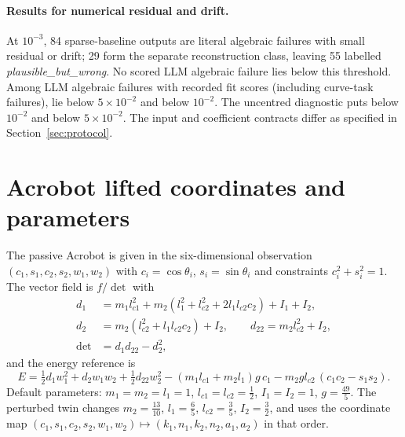 \documentclass[10pt]{article}
\begin{document}
\begin{table}[!htbp]
\centering\small
\tabSensitivity
\caption{Counts of literal algebraic failures below each numerical threshold. Reconstruction-dependent answers are included here, although they occupy a separate verdict class in Table~\ref{tab:results-sindy}. ``Uncentred'' evaluates the submitted expression; ``centred'' uses the quotient representative with its constant coefficient removed. Vanishing-task scores are unchanged. These counts describe diagnostics on the same returned expressions and are not capability comparisons.}
\label{tab:sensitivity}
\end{table}

\paragraph{Results for numerical residual and drift.} At $10^{-3}$, 84 sparse-baseline outputs are literal algebraic failures with small residual or drift; 29 form the separate reconstruction class, leaving 55 labelled \emph{plausible\_but\_wrong}. No scored LLM algebraic failure lies below this threshold. Among \nFit{} LLM algebraic failures with recorded fit scores (including curve-task failures), \nFitMid{} lie below $5\times10^{-2}$ and \nFitLow{} below $10^{-2}$. The uncentred diagnostic puts \nLegacyLow{} below $10^{-2}$ and \nLegacyMid{} below $5\times10^{-2}$. The input and coefficient contracts differ as specified in Section~\ref{sec:protocol}.

\section{Acrobot lifted coordinates and parameters}\label{app:acrobot}

The passive Acrobot is given in the six-dimensional observation $(c_1,s_1,c_2,s_2,w_1,w_2)$ with $c_i=\cos\theta_i$, $s_i=\sin\theta_i$ and constraints $c_i^2+s_i^2=1$. The vector field is $f/\det$ with
\begin{align*}
d_1 &= m_1 l_{c1}^2 + m_2(l_1^2 + l_{c2}^2 + 2 l_1 l_{c2} c_2) + I_1 + I_2,\\
d_2 &= m_2(l_{c2}^2 + l_1 l_{c2} c_2) + I_2,\qquad d_{22} = m_2 l_{c2}^2 + I_2,\\
\det &= d_1 d_{22} - d_2^2,
\end{align*}
and the energy reference is
\[
E = \tfrac12 d_1 w_1^2 + d_2 w_1 w_2 + \tfrac12 d_{22} w_2^2
    - (m_1 l_{c1} + m_2 l_1) g\, c_1
    - m_2 g l_{c2}\,(c_1 c_2 - s_1 s_2).
\]
Default parameters: $m_1=m_2=l_1=1$, $l_{c1}=l_{c2}=\tfrac12$, $I_1=I_2=1$, $g=\tfrac{49}{5}$. The perturbed twin changes $m_2=\tfrac{13}{10}$, $l_1=\tfrac65$, $l_{c2}=\tfrac35$, $I_2=\tfrac32$, and uses the coordinate map $(c_1,s_1,c_2,s_2,w_1,w_2)\mapsto(k_1,n_1,k_2,n_2,a_1,a_2)$ in that order.
\end{document}
